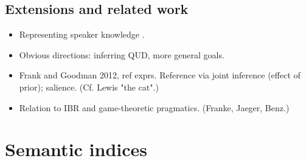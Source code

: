 \documentclass[pdfextras]{handbook}
\begin{document}


\subsection{Extensions and related work}


\begin{itemize}
\item Representing speaker knowledge \cite{Goodman2013}.
\item Obvious directions: inferring QUD, more general goals.
\item Frank and Goodman 2012, ref exprs. Reference via joint inference (effect of prior); salience. (Cf. Lewis "the cat".)
\item Relation to IBR and game-theoretic pragmatics. (Franke, Jaeger, Benz.)
\end{itemize}





\section{Semantic indices}
\label{indices}
\end{document}
